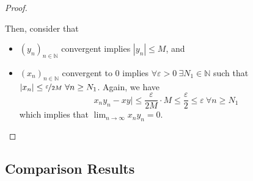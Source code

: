 \documentclass{article}
\newcommand{\N}{\mathbb{N}}
\newcommand{\seq}[2]{(#1_{#2})_{#2 \in \N}}
\newcommand{\?}{\stackrel{?}{=}}
\begin{document}
\begin{itemize}
\begin{proof}
\begin{itemize}
            Then, consider that
            \begin{itemize}
                \item $\seq{y}{n}$ convergent implies $|y_n| \leq M$, and
                \item $\seq{x}{n}$ convergent to 0 implies $\forall \varepsilon > 0 \ \exists N_1 \in \N$ such that $|x_n| \leq \nicefrac{\varepsilon}{2M} \ \forall n \geq N_1$. Again, we have
                $$x_ny_n - xy| \leq \frac{\varepsilon}{2M} \cdot M \leq \frac{\varepsilon}{2} \leq \varepsilon \ \forall n \geq N_1$$
                which implies that $\lim_{n \to \infty} x_ny_n = 0$.
            \end{itemize}
        \end{itemize}
    \end{proof}
\end{itemize}

\subsection*{Comparison Results}
\end{document}
